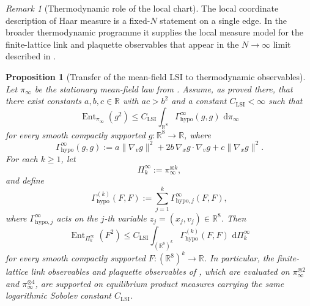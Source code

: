 \documentclass[11pt]{article}
\newtheorem{proposition}[theorem]{Proposition}
\theoremstyle{remark}
\newtheorem{remark}[theorem]{Remark}
\newcommand{\R}{\mathbb R}
\newcommand{\dd}{\,\mathrm d}
\newcommand{\Ent}{\operatorname{Ent}}
\begin{document}
\begin{remark}[Thermodynamic role of the local chart]
The local coordinate description of Haar measure is a fixed-$N$ statement on a
single edge.  In the broader thermodynamic programme it supplies the local
measure model for the finite-lattice link and plaquette observables that appear in
the $N\to\infty$ limit described in \cite{convergence,continuumqft}.
\end{remark}

\begin{proposition}[Transfer of the mean-field LSI to thermodynamic observables]
\label{prop:thermo-lsi-transfer}
Let $\pi_\infty$ be the stationary mean-field law from \cite{convergence}.
Assume, as proved there, that there exist constants $a,b,c\in\R$ with
$ac>b^2$ and a constant $C_{\mathrm{LSI}}<\infty$ such that
\[
\Ent_{\pi_\infty}(g^2)
\le
C_{\mathrm{LSI}}
\int_{\R^8}\Gamma_{\mathrm{hypo}}^\infty(g,g)\,\dd\pi_\infty
\]
for every smooth compactly supported $g:\R^8\to\R$, where
\[
\Gamma_{\mathrm{hypo}}^\infty(g,g)
:=
a\|\nabla_v g\|^2
+2b\,\nabla_x g\cdot\nabla_v g
+c\|\nabla_x g\|^2.
\]
For each $k\ge1$, let
\[
\Pi_k^\infty:=\pi_\infty^{\otimes k},
\]
and define
\[
\Gamma_{\mathrm{hypo}}^{(k)}(F,F)
:=
\sum_{j=1}^k \Gamma_{\mathrm{hypo},j}^\infty(F,F),
\]
where $\Gamma_{\mathrm{hypo},j}^\infty$ acts on the $j$-th variable
$z_j=(x_j,v_j)\in\R^8$.  Then
\[
\Ent_{\Pi_k^\infty}(F^2)
\le
C_{\mathrm{LSI}}
\int_{(\R^8)^k}\Gamma_{\mathrm{hypo}}^{(k)}(F,F)\,\dd\Pi_k^\infty
\]
for every smooth compactly supported $F:(\R^8)^k\to\R$.
In particular, the finite-lattice link observables and plaquette observables of
\cite{continuumqft}, which are evaluated on $\pi_\infty^{\otimes2}$ and
$\pi_\infty^{\otimes4}$, are supported on equilibrium product measures
carrying the same logarithmic Sobolev constant $C_{\mathrm{LSI}}$.
\end{proposition}
\end{document}
